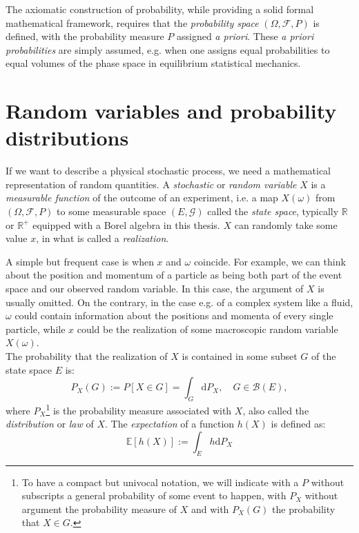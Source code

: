 \documentclass[a4paper,12pt]{book}
\begin{document}
The axiomatic construction of probability, while providing a solid formal mathematical framework, requires that the \textit{probability space} $(\Omega,\mathcal{F}, P)$ is defined, with the probability measure $P$ assigned \textit{a priori}. These \textit{a priori probabilities} are simply assumed, e.g. when one assigns equal probabilities to equal volumes of the phase space in equilibrium statistical mechanics.


\section{Random variables and probability distributions}

If we want to describe a physical stochastic process, we need a mathematical representation of random quantities. A \textit{stochastic} or \textit{random variable} $X$ is a \textit{measurable function} of the outcome of an experiment, i.e. a map $X(\omega)$ from $(\Omega,\mathcal{F},P)$ to some measurable space $(E,\mathcal{G})$ called the \textit{state space}, typically $\mathbb{R}$ or $\mathbb{R}^+$ equipped with a Borel algebra in this thesis. $X$ can randomly take some value $x$, in what is called a \textit{realization}. 

A simple but frequent case is when $x$ and $\omega$ coincide. For example, we can think about the position and momentum of a particle as being both part of the event space and our observed random variable. In this case, the argument of $X$ is usually omitted. On the contrary, in the case e.g. of a complex system like a fluid, $\omega$ could contain information about the positions and momenta of every single particle, while $x$ could be the realization of some macroscopic random variable $X(\omega)$.\\

The probability that the realization of $X$ is contained in some subset $G$ of the state space $E$ is:
\begin{equation}
   \label{eq:prob}
   P_X(G) := P[X \in G]=\int_G \mathrm{d} P_X, \quad G \in \mathcal{B}(E),
\end{equation}
where $P_X$\footnote{To have a compact but univocal notation, we will indicate with a $P$ without subscripts a general probability of some event to happen, with $P_{X}$ without argument the probability measure of $X$ and with $P_{X}(G)$ the probability that $X \in G$. } is the probability measure associated with $X$, also called the \textit{distribution} or \textit{law} of $X$. The \textit{expectation} of a function $h(X)$ is defined as:
\begin{equation}
\label{eq:expectation}
  \mathbb{E}[h(X)]:=\int_{E} h \mathrm{d}P_X
\end{equation}
\end{document}
